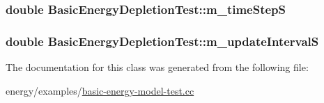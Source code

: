 \subsubsection[{\texorpdfstring{m\+\_\+time\+StepS}{m_timeStepS}}]{\setlength{\rightskip}{0pt plus 5cm}double Basic\+Energy\+Depletion\+Test\+::m\+\_\+time\+StepS\hspace{0.3cm}{\ttfamily [private]}}\hypertarget{classBasicEnergyDepletionTest_a7aab78ab746425724fcb2e4dc1632e89}{}\label{classBasicEnergyDepletionTest_a7aab78ab746425724fcb2e4dc1632e89}
\subsubsection[{\texorpdfstring{m\+\_\+update\+IntervalS}{m_updateIntervalS}}]{\setlength{\rightskip}{0pt plus 5cm}double Basic\+Energy\+Depletion\+Test\+::m\+\_\+update\+IntervalS\hspace{0.3cm}{\ttfamily [private]}}\hypertarget{classBasicEnergyDepletionTest_a2e9f6deba1930b5c4ef2ad4c624dbd87}{}\label{classBasicEnergyDepletionTest_a2e9f6deba1930b5c4ef2ad4c624dbd87}


The documentation for this class was generated from the following file\+:\begin{DoxyCompactItemize}
\item 
energy/examples/\hyperlink{basic-energy-model-test_8cc}{basic-\/energy-\/model-\/test.\+cc}\end{DoxyCompactItemize}

